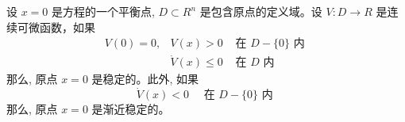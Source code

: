\begin{theorem}
    设 $x=0$ 是方程的一个平衡点, $D \subset R^n$ 是包含原点的定义域。设 $V: D \rightarrow R$ 是连续可微函数，如果
    \begin{equation}
        \begin{array}{lll}
        V(0)=0, & V(x)>0 & \text { 在 } D-\{0\} \text { 内 } \\
        & \dot{V}(x) \leqslant 0 & \text { 在 } D \text { 内 }
        \end{array}
    \end{equation}
    那么, 原点 $x=0$ 是稳定的。此外, 如果
    \begin{equation}
        \dot{V}(x)<0 \quad \text { 在 } D-\{0\} \text { 内 }
    \end{equation}
    那么, 原点 $x=0$ 是渐近稳定的。
\end{theorem}
